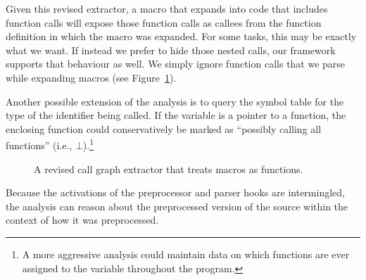 \documentclass{article}
\newcommand{\ie}{i.e.,}
\begin{document}
\noindent Given this revised extractor, a macro that expands into code
that includes function calls will expose those function calls as callees
from the function definition in which the macro was expanded.  For some
tasks, this may be exactly what we want.  If instead we prefer to hide
those nested calls, our framework supports that behaviour as well.  We
simply ignore function calls that we parse while expanding macros (see
Figure~\ref{fig:rev_call_graph_extractor}).

Another possible extension of the analysis is to query the symbol table
for the type of the identifier being called.  If the variable is a
pointer to a function, the enclosing function could conservatively be
marked as ``possibly calling all functions'' (\ie{} $\bot$).\footnote{A more
aggressive analysis could maintain data on which functions
are ever assigned to the variable throughout the program.}

\begin{figure}[p]
\begin{center}
\begin{small}
\end{small}
\caption{A revised call graph extractor that treats macros as functions.}
\label{fig:rev_call_graph_extractor}
\end{center}
\end{figure}

Because the activations of the preprocessor and parser hooks
are intermingled, the analysis can reason about the preprocessed version 
of the source within the context of how it was preprocessed.  
\end{document}
